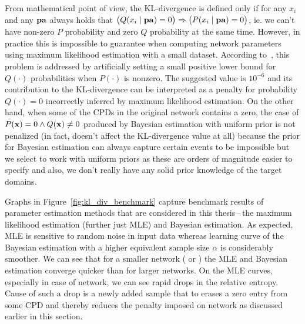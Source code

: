 \documentclass[english,cover]{fitthesis} %
\newcommand{\vars}[1]{{\bold{#1}}}         %
\begin{document}
From mathematical point of view, the KL-divergence is defined only if for any $x_i$ and any $\vars{pa}$ always holds that $\bigl( Q(x_i \mid \vars{pa}) = 0 \bigr) \Rightarrow \bigl( P(x_i \mid \vars{pa}) = 0 \bigr)$, ie. we can't have non-zero $P$ probability and zero $Q$ probability at the same time. However, in practice this is impossible to guarantee when computing network parameters using maximum likelihood estimation with a small dataset. According to~\cite{kl_divergence_wifi,kl_divergence_noisy_max}, this problem is addressed by artificially setting a small positive lower bound for $Q(\cdot)$ probabilities when $P(\cdot)$ is nonzero. The suggested value is $10^{-6}$ and its contribution to the KL-divergence can be interpreted as a penalty for probability $Q(\cdot) = 0$ incorrectly inferred by maximum likelihood estimation. On the other hand, when some of the CPDs in the original network contains a zero, the case of $P(\vars{x}) = 0 \land Q(\vars{x}) \neq 0$ produced by Bayesian estimation with uniform prior is not penalized (in fact, doesn't affect the KL-divergence value at all) because the prior for Bayesian estimation can always capture certain events to be impossible but we select to work with uniform priors as these are orders of magnitude easier to specify and also, we don't really have any solid prior knowledge of the target domains.

Graphs in Figure~\ref{fig:kl_div_benchmark} capture benchmark results of parameter estimation methods that are considered in this thesis\,--\,the maximum likelihood estimation (further just MLE) and Bayesian estimation. As expected, MLE is sensitive to random noise in input data whereas learning curve of the Bayesian estimation with a higher equivalent sample size $\alpha$ is considerably smoother. We can see that for a smaller network ( or ) the MLE and Bayesian estimation converge quicker than for larger networks. On the MLE curves, especially in case of  network, we can see rapid drops in the relative entropy. Cause of such a drop is a newly added sample that to erases a zero entry from some CPD and thereby reduces the penalty imposed on network as discussed earlier in this section.
\end{document}
